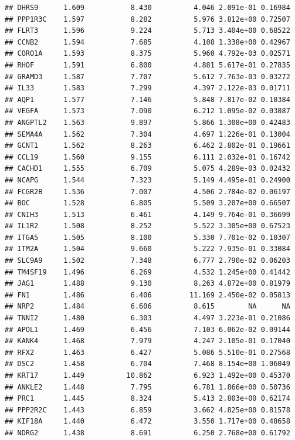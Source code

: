 \documentclass{article}\usepackage[]{graphicx}\usepackage[]{color}
\makeatletter
\newenvironment{kframe}{%
 \def\at@end@of@kframe{}%
 \ifinner\ifhmode%
  \def\at@end@of@kframe{\end{minipage}}%
  \begin{minipage}{\columnwidth}%
 \fi\fi%
 \def\FrameCommand##1{\hskip\@totalleftmargin \hskip-\fboxsep
 \colorbox{shadecolor}{##1}\hskip-\fboxsep
     \hskip-\linewidth \hskip-\@totalleftmargin \hskip\columnwidth}%
 \MakeFramed {\advance\hsize-\width
   \@totalleftmargin\z@ \linewidth\hsize
   \@setminipage}}%
 {\par\unskip\endMakeFramed%
 \at@end@of@kframe}
\newenvironment{knitrout}{}{} %
\makeatother
\begin{document}
\begin{knitrout}
\begin{kframe}
\begin{verbatim}
## DHRS9      1.609           8.430          4.046 2.091e-01 0.16984
## PPP1R3C    1.597           8.282          5.976 3.812e+00 0.72507
## FLRT3      1.596           9.224          5.713 3.404e+00 0.68522
## CCNB2      1.594           7.685          4.108 1.338e+00 0.42967
## CORO1A     1.593           8.375          5.960 4.792e-03 0.02571
## RHOF       1.591           6.800          4.881 5.617e-01 0.27835
## GRAMD3     1.587           7.707          5.612 7.763e-03 0.03272
## IL33       1.583           7.299          4.397 2.122e-03 0.01711
## AQP1       1.577           7.146          5.848 7.817e-02 0.10384
## VEGFA      1.573           7.090          6.212 1.095e-02 0.03887
## ANGPTL2    1.563           9.897          5.866 1.308e+00 0.42483
## SEMA4A     1.562           7.304          4.697 1.226e-01 0.13004
## GCNT1      1.562           8.263          6.462 2.802e-01 0.19661
## CCL19      1.560           9.155          6.111 2.032e-01 0.16742
## CACHD1     1.555           6.709          5.075 4.289e-03 0.02432
## NCAPG      1.544           7.323          5.149 4.495e-01 0.24900
## FCGR2B     1.536           7.007          4.506 2.784e-02 0.06197
## BOC        1.528           6.805          5.509 3.207e+00 0.66507
## CNIH3      1.513           6.461          4.149 9.764e-01 0.36699
## IL1R2      1.508           8.252          5.522 3.305e+00 0.67523
## ITGA5      1.505           8.100          5.330 7.701e-02 0.10307
## ITM2A      1.504           9.660          5.222 7.935e-01 0.33084
## SLC9A9     1.502           7.348          6.777 2.790e-02 0.06203
## TM4SF19    1.496           6.269          4.532 1.245e+00 0.41442
## JAG1       1.488           9.130          8.263 4.872e+00 0.81979
## FN1        1.486           6.406         11.169 2.450e-02 0.05813
## NRP2       1.484           6.606          8.615        NA      NA
## TNNI2      1.480           6.303          4.497 3.223e-01 0.21086
## APOL1      1.469           6.456          7.103 6.062e-02 0.09144
## KANK4      1.468           7.979          4.247 2.105e-01 0.17040
## RFX2       1.463           6.427          5.086 5.510e-01 0.27568
## DSC2       1.458           6.704          7.468 8.154e+00 1.06049
## KRT17      1.449          10.862          6.923 1.492e+00 0.45370
## ANKLE2     1.448           7.795          6.781 1.866e+00 0.50736
## PRC1       1.445           8.324          5.413 2.803e+00 0.62174
## PPP2R2C    1.443           6.859          3.662 4.825e+00 0.81578
## KIF18A     1.440           6.472          3.550 1.717e+00 0.48658
## NDRG2      1.438           8.691          6.250 2.768e+00 0.61792

\end{verbatim}
\end{kframe}
\end{knitrout}
\end{document}
